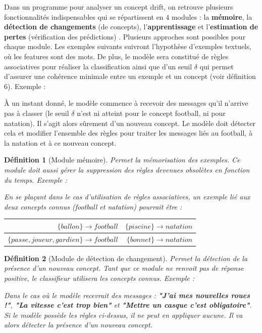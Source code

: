 \documentclass[utf8]{stageM2R} %
\newtheorem{mydef}{Définition}
\theoremstyle{remark}
\renewcommand{\emph}{\textbf}
\newenvironment{exemple}{%
\upshape Exemple :%
    \small     %
}{%
}
\begin{document}
Dans un programme pour analyser un concept drift, on retrouve plusieurs fonctionnalités indispensables qui se répartissent en $4$ modules : la \emph{mémoire}, la \emph{détection de changements} (de concepts), l'\emph{apprentissage} et l'\emph{estimation de pertes} (vérification des prédictions) \cite{Gama2014}.
Plusieurs approches sont possibles pour chaque module. Les exemples suivants suivront l'hypothèse d'exemples textuels, où les features sont des mots. De plus, le modèle sera constitué de règles associatives pour réaliser la classification ainsi que d'un seuil $\delta$ qui permet d'assurer une cohérence minimale entre un exemple et un concept (voir définition 6).
\begin{exemple}
À un instant donné, le modèle commence à recevoir des messages qu'il n'arrive pas à classer (le seuil $\delta$ n'est ni atteint pour le concept football, ni pour natation). Il s'agit alors sûrement d'un nouveau concept. Le modèle doit  détecter cela et  modifier l'ensemble des règles pour  traiter les messages liés au football, à la natation et à ce nouveau concept.
\end{exemple}


\begin{mydef}[Module mémoire] Permet la mémorisation des exemples. Ce module doit aussi gérer la suppression des règles devenues obsolètes en fonction du temps.
\begin{exemple}
En se plaçant dans le cas d'utilisation de règles associatives, un exemple lié aux deux concepts connus (football et natation) pourrait être :
\begin{table}[!h]
\begin{tabular}{|r|r|}
	\hline
	$\{ballon\}\rightarrow football$&
	$\{piscine\}\rightarrow natation$\\
	\hline
	$\{passe,joueur,gardien\}\rightarrow football$&
	$\{bonnet\}\rightarrow natation$\\
	\hline
	\end{tabular}
\centering
\end{table}
\end{exemple}
\end{mydef}

\begin{mydef}[Module de détection de changement] Permet la détection de la présence d'un nouveau concept. Tant que ce module ne renvoit pas de réponse positive, le classifieur utilisera les concepts connus.
\begin{exemple}
Dans le cas où le modèle recevrait des messages  : \emph{"J'ai mes nouvelles roues !"}, \emph{"La vitesse c'est trop bien"} et \emph{"Mettre un casque c'est obligatoire"}. Si le modèle possède les règles ci-dessus, il ne peut en appliquer aucune. Il va alors détecter la présence d'un nouveau concept.  
\end{exemple}
\end{mydef}
\end{document}
